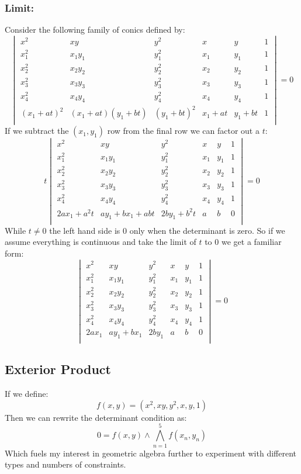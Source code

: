 \subsubsection{Limit:}
Consider the following family of conics defined by:
\[
	\begin{vmatrix}
	x^2&xy&y^2&x&y&1\\
	x_1^2&x_1y_1&y_1^2&x_1&y_1&1\\
	x_2^2&x_2y_2&y_2^2&x_2&y_2&1\\
	x_3^2&x_3y_3&y_3^2&x_3&y_3&1\\
	x_4^2&x_4y_4&y_4^2&x_4&y_4&1\\
	(x_1+at)^2&(x_1+at)(y_1+bt)&(y_1+bt)^2&x_1+at&y_1+bt&1\\
	\end{vmatrix}=0
\]
If we subtract the $(x_1,y_1)$ row from the final row we can factor out a $t$: 
\[
	t\begin{vmatrix}
	x^2&xy&y^2&x&y&1\\
	x_1^2&x_1y_1&y_1^2&x_1&y_1&1\\
	x_2^2&x_2y_2&y_2^2&x_2&y_2&1\\
	x_3^2&x_3y_3&y_3^2&x_3&y_3&1\\
	x_4^2&x_4y_4&y_4^2&x_4&y_4&1\\
	2ax_1+a^2t&ay_1+bx_1+abt&2by_1+b^2t&a&b&0\\
	\end{vmatrix}=0
\]
While $t\neq 0$ the left hand side is $0$ only when the determinant is zero.
So if we assume everything is continuous and take the limit of $t$ to $0$ we get a familiar form:
\[
	\begin{vmatrix}
	x^2&xy&y^2&x&y&1\\
	x_1^2&x_1y_1&y_1^2&x_1&y_1&1\\
	x_2^2&x_2y_2&y_2^2&x_2&y_2&1\\
	x_3^2&x_3y_3&y_3^2&x_3&y_3&1\\
	x_4^2&x_4y_4&y_4^2&x_4&y_4&1\\
	2ax_1&ay_1+bx_1&2by_1&a&b&0\\
	\end{vmatrix}=0
\]

\subsection{Exterior Product}
If we define:
\[f(x,y) = (x^2,xy,y^2,x,y,1)\]
Then we can rewrite the determinant condition as:
\[ 0 = f(x,y)\wedge\bigwedge_{n=1}^5f(x_n,y_n)\]
Which fuels my interest in geometric algebra further to experiment with different types and numbers of constraints. 
